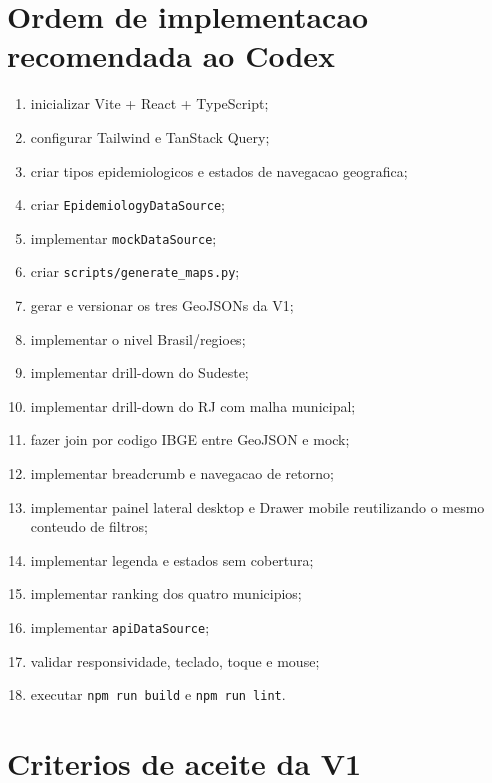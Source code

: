 \documentclass[12pt,a4paper]{article}
\begin{document}
\section{Ordem de implementacao recomendada ao Codex}

\begin{enumerate}[leftmargin=*]
    \item inicializar Vite + React + TypeScript;
    \item configurar Tailwind e TanStack Query;
    \item criar tipos epidemiologicos e estados de navegacao geografica;
    \item criar \texttt{EpidemiologyDataSource};
    \item implementar \texttt{mockDataSource};
    \item criar \texttt{scripts/generate\_maps.py};
    \item gerar e versionar os tres GeoJSONs da V1;
    \item implementar o nivel Brasil/regioes;
    \item implementar drill-down do Sudeste;
    \item implementar drill-down do RJ com malha municipal;
    \item fazer join por codigo IBGE entre GeoJSON e mock;
    \item implementar breadcrumb e navegacao de retorno;
    \item implementar painel lateral desktop e Drawer mobile reutilizando o mesmo conteudo de filtros;
    \item implementar legenda e estados sem cobertura;
    \item implementar ranking dos quatro municipios;
    \item implementar \texttt{apiDataSource};
    \item validar responsividade, teclado, toque e mouse;
    \item executar \texttt{npm run build} e \texttt{npm run lint}.
\end{enumerate}

\section{Criterios de aceite da V1}
\end{document}
